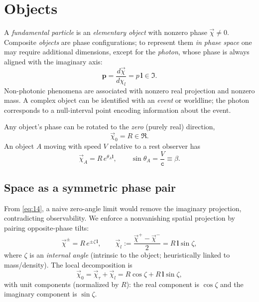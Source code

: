 \documentclass[11pt]{article}
\numberwithin{equation}{section}
\begin{document}
\section{Objects}
A \emph{fundamental particle} is an \emph{elementary object} with nonzero phase $\vec{\chi}\neq0$. Composite \emph{objects} are phase configurations; to represent them \emph{in phase space} one may require additional dimensions, except for the \emph{photon}, whose phase is always aligned with the imaginary axis:
\begin{equation}
\mathbf{p}=\frac{d\vec{\chi}}{d\chi_l}=p\,\mathbf{l}\in\Im.
\label{eq:31}
\end{equation}
Non-photonic phenomena are associated with nonzero real projection and nonzero mass. A complex object can be identified with an \emph{event} or worldline; the photon corresponds to a null-interval point encoding information about the event.

Any object's phase can be rotated to the \emph{zero} (purely real) direction,
\begin{equation}
\vec{\chi}_0=R\in\Re.
\label{eq:32}
\end{equation}
An object $A$ moving with speed $V$ relative to a rest observer has
\begin{equation}
\vec{\chi}_A=R\,e^{\theta_A\mathbf{l}},\qquad
\sin\theta_A=\frac{V}{\mathtt{c}}\equiv\beta.
\label{eq:33}
\end{equation}

\subsection{Space as a symmetric phase pair}
From \eqref{eq:14}, a naive zero-angle limit would remove the imaginary projection, contradicting observability. We enforce a nonvanishing spatial projection by pairing opposite-phase tilts:
\begin{equation}
\vec{\chi}^{\pm}=R\,e^{\pm\zeta\,\mathbf{l}},\qquad
\vec{\chi}_l:=\frac{\vec{\chi}^+-\vec{\chi}^-}{2}=R\,\mathbf{l}\sin\zeta,
\label{eq:311}
\end{equation}
where $\zeta$ is an \emph{internal angle} (intrinsic to the object; heuristically linked to mass/density). The local decomposition is
\begin{equation}
\vec{\chi}_0=\vec{\chi}_\tau+\vec{\chi}_l
=R\cos\zeta+R\,\mathbf{l}\sin\zeta,
\label{eq:312}
\end{equation}
with unit components (normalized by $R$): the real component is $\cos\zeta$ and the imaginary component is $\sin\zeta$.
\end{document}
